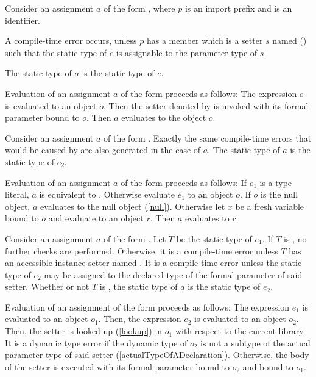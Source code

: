 \documentclass[makeidx]{article}
\begin{document}
{\LMHash{}%
Consider an assignment $a$ of the form ,
where $p$ is an import prefix and \id{} is an identifier.

\LMHash{}%
A compile-time error occurs,
unless $p$ has a member which is a setter $s$ named 
()
such that the static type of $e$
is assignable to the parameter type of $s$.

\LMHash{}%
The static type of $a$ is the static type of $e$.

\LMHash{}%
\LMHash{}%
Evaluation of an assignment $a$ of the form 
proceeds as follows:
The expression $e$ is evaluated to an object $o$.
Then the setter denoted by  is invoked
with its formal parameter bound to $o$.
Then $a$ evaluates to the object $o$.
\EndCase

\LMHash{}%
Consider an assignment $a$ of the form .
Exactly the same compile-time errors that would be caused by
 are also generated in the case of $a$.
The static type of $a$ is the static type of $e_2$.

\LMHash{}%
Evaluation of an assignment $a$ of the form 
proceeds as follows:
If $e_1$ is a type literal, $a$ is equivalent to .
Otherwise evaluate $e_1$ to an object $o$.
If $o$ is the null object, $a$ evaluates to the null object (\ref{null}).
Otherwise let $x$ be a fresh variable bound to $o$
and evaluate  to an object $r$.
Then $a$ evaluates to $r$.
\EndCase

\LMHash{}%
Consider an assignment $a$ of the form .
Let $T$ be the static type of $e_1$.
If $T$ is \DYNAMIC{}, no further checks are performed.
Otherwise, it is a compile-time error unless
$T$ has an accessible instance setter named .
It is a compile-time error unless the static type of $e_2$
may be assigned to the declared type of the formal parameter of said setter.
Whether or not $T$ is \DYNAMIC{},
the static type of $a$ is the static type of $e_2$.

\LMHash{}%
Evaluation of an assignment of the form 
proceeds as follows:
The expression $e_1$ is evaluated to an object $o_1$.
Then, the expression $e_2$ is evaluated to an object $o_2$.
Then, the setter  is looked up (\ref{lookup}) in $o_1$ with respect to the current library.
It is a dynamic type error if the dynamic type of $o_2$
is not a subtype of the actual parameter type of said setter
(\ref{actualTypeOfADeclaration}).
Otherwise, the body of the setter is executed with its formal parameter bound to $o_2$ and \THIS{} bound to $o_1$.

}
\end{document}
